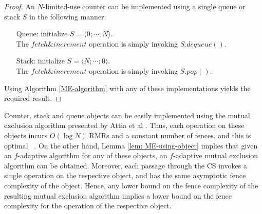\begin{proof}
		An $N$-limited-use counter can be implemented using a single queue or stack $S$ in the following manner:
		\begin{enumerate}
			\item[Queue:] initialize $S = \langle 0; \cdots ; N \rangle$.\\
			The $fetch \& increment$ operation is simply invoking $S.dequeue()$.
			\item[Stack:] initialize $S = \langle N; \cdots ; 0 \rangle$. \\
			The $fetch \& increment$ operation is simply invoking $S.pop()$.
		\end{enumerate}
		Using Algorithm \ref{ME-algorithm} with any of these implementations yields the required result.
	\end{proof}
	
	Counter, stack and queue objects can be easily implemented using the mutual exclusion algorithm presented by Attia et al \cite{DBLP:conf/podc/AttiyaHL13}. Thus, each operation on these objects incurs $O(\log N)$ RMRs and a constant number of fences, and this is optimal ~\cite{DBLP:conf/stoc/AttiyaHW08}. On the other hand, Lemma \ref{lem: ME-using-object} implies that given an $f$-adaptive algorithm for any of these objects, an $f$-adaptive mutual exclusion algorithm can be obtained. Moreover, each passage through the CS invokes a single operation on the respective object, and has the same asymptotic fence complexity of the object. Hence, any lower bound on the fence complexity of the resulting mutual exclusion algorithm implies a lower bound on the fence complexity for the operation of the respective object.
	
	\begin{comment}	
	\begin{theorem}
		Let $\mathcal{C}$ be a weak obstruction-free $N$-process $f$-adaptive algorithm for any of the following objects: counter, stack or queue. Let $i \in \mathbb{N}$ be such that $f(i) \leq \dfrac{N^{2^{-f(i)}}} {f(i)! \cdot 4^{f(i)+2i}}$.
		Then there exists an execution $H$ and a process $p$ such that $p$ executes $i$ fences in $H$ during a single operation ($fetch \& increment$, $dequeue$, or $pop$ respectively).
	\end{theorem}
	\end{comment}

